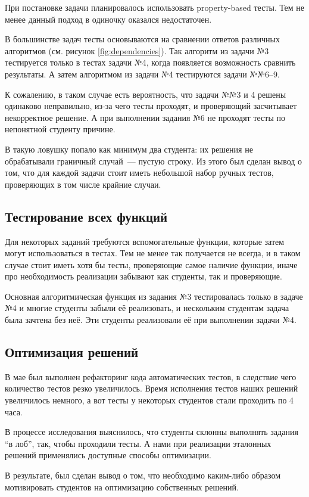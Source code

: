 При постановке задачи планировалось использовать property-based тесты.
Тем не менее данный подход в одиночку оказался недостаточен.

В большинстве задач тесты основываются на сравнении ответов различных алгоритмов (см. рисунок \ref{fig:dependencies}).
Так алгоритм из задачи №3 тестируется только в тестах задачи №4, когда появляется возможность сравнить результаты.
А затем алгоритмом из задачи №4 тестируются задачи №№6--9.

К сожалению, в таком случае есть вероятность, что задачи №№3 и 4 решены одинаково неправильно, из-за чего тесты проходят, и проверяющий засчитывает некорректное решение.
А при выполнении задания №6 не проходят тесты по непонятной студенту причине.

В такую ловушку попало как минимум два студента: их решения не обрабатывали граничный случай~--- пустую строку.
Из этого был сделан вывод о том, что для каждой задачи стоит иметь небольшой набор ручных тестов, проверяющих в том числе крайние случаи.

\subsection{Тестирование всех функций}

Для некоторых заданий требуются вспомогательные функции, которые затем могут использоваться в тестах.
Тем не менее так получается не всегда, и в таком случае стоит иметь хотя бы тесты, проверяющие самое наличие функции, иначе про необходимость реализации забывают как студенты, так и проверяющие.

Основная алгоритмическая функция из задания №3 тестировалась только в задаче №4 и многие студенты забыли её реализовать, и нескольким студентам задача была зачтена без неё.
Эти студенты реализовали её при выполнении задачи №4.

\subsection{Оптимизация решений}

В мае был выполнен рефакторинг кода автоматических тестов, в следствие чего количество тестов резко увеличилось.
Время исполнения тестов наших решений увеличилось немного, а вот тесты у некоторых студентов стали проходить по 4 часа.

В процессе исследования выяснилось, что студенты склонны выполнять задания \enquote{в лоб}, так, чтобы проходили тесты.
А нами при реализации эталонных решений применялись доступные способы оптимизации.

В результате, был сделан вывод о том, что необходимо каким-либо образом мотивировать студентов на оптимизацию собственных решений.
